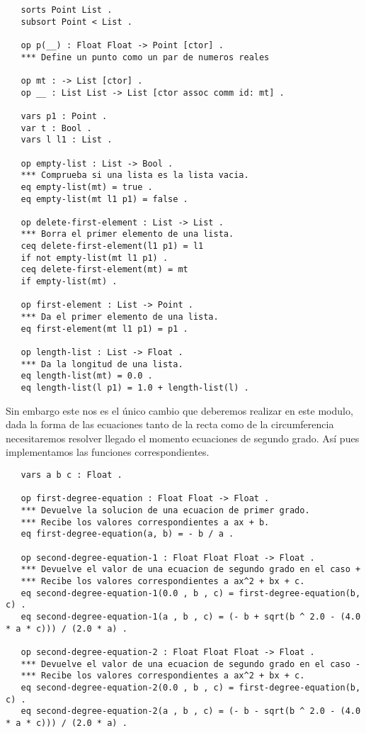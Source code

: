 \begin{verbatim}
   sorts Point List .
   subsort Point < List .

   op p(__) : Float Float -> Point [ctor] .
   *** Define un punto como un par de numeros reales

   op mt : -> List [ctor] .
   op __ : List List -> List [ctor assoc comm id: mt] . 

   vars p1 : Point .
   var t : Bool .
   vars l l1 : List .

   op empty-list : List -> Bool .
   *** Comprueba si una lista es la lista vacia.
   eq empty-list(mt) = true . 
   eq empty-list(mt l1 p1) = false .

   op delete-first-element : List -> List .
   *** Borra el primer elemento de una lista.
   ceq delete-first-element(l1 p1) = l1
   if not empty-list(mt l1 p1) .
   ceq delete-first-element(mt) = mt
   if empty-list(mt) .

   op first-element : List -> Point .
   *** Da el primer elemento de una lista.
   eq first-element(mt l1 p1) = p1 .

   op length-list : List -> Float .
   *** Da la longitud de una lista.
   eq length-list(mt) = 0.0 .
   eq length-list(l p1) = 1.0 + length-list(l) .

\end{verbatim}

Sin embargo este nos es el \'unico cambio que deberemos realizar en este modulo, dada la forma de las ecuaciones tanto de la recta como de la circumferencia necesitaremos resolver llegado el momento ecuaciones de segundo grado. As\'i pues implementamos las funciones correspondientes. \par

\begin{verbatim}
   vars a b c : Float .

   op first-degree-equation : Float Float -> Float .
   *** Devuelve la solucion de una ecuacion de primer grado.
   *** Recibe los valores correspondientes a ax + b.
   eq first-degree-equation(a, b) = - b / a .

   op second-degree-equation-1 : Float Float Float -> Float .
   *** Devuelve el valor de una ecuacion de segundo grado en el caso +
   *** Recibe los valores correspondientes a ax^2 + bx + c.
   eq second-degree-equation-1(0.0 , b , c) = first-degree-equation(b, c) .
   eq second-degree-equation-1(a , b , c) = (- b + sqrt(b ^ 2.0 - (4.0 * a * c))) / (2.0 * a) . 

   op second-degree-equation-2 : Float Float Float -> Float .
   *** Devuelve el valor de una ecuacion de segundo grado en el caso -
   *** Recibe los valores correspondientes a ax^2 + bx + c.
   eq second-degree-equation-2(0.0 , b , c) = first-degree-equation(b, c) .
   eq second-degree-equation-2(a , b , c) = (- b - sqrt(b ^ 2.0 - (4.0 * a * c))) / (2.0 * a) .

\end{verbatim}

